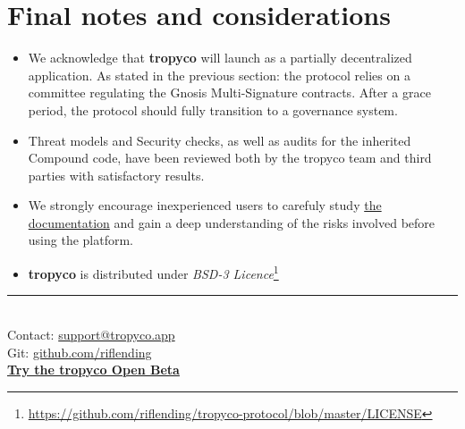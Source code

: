 \documentclass{article}
\begin{document}
\section{Final notes and considerations}

\begin{itemize}
\item We acknowledge that \textbf{tropyco} will launch as a partially decentralized application. As stated in the previous section: the protocol relies on a committee regulating the Gnosis Multi-Signature contracts. After a grace period, the protocol should fully transition to a governance system.
\item Threat models and Security checks, as well as audits for the inherited Compound code, have been reviewed both by the tropyco team and third parties with satisfactory results.
\item We strongly encourage inexperienced users to carefuly study \href{https://test.tropyco.app/doc}{the documentation} and gain a deep understanding of the risks involved before using the platform.
\item \textbf{tropyco} is distributed under \textit{BSD-3 Licence}\footnote{\href{https://github.com/riflending/tropyco-protocol/blob/master/LICENSE}{https://github.com/riflending/tropyco-protocol/blob/master/LICENSE}}
\\[0.1in]
\end{itemize}
\begin{center}
\noindent\rule{8cm}{0.4pt}
\\[0.5in]
Contact: \href{mailto:support@tropyco.app}{support@tropyco.app}\\
Git: \href{https://github.com/riflending/tropyco-protocol}{github.com/riflending}\\[0.1in]
\textbf{\href{https://test.tropyco.app}{Try the tropyco Open Beta}}

\end{center}


\end{document}
